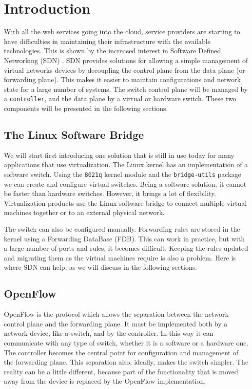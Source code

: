 \chapter{Introduction}
\label{chapter:intro}

With all the web services going into the cloud\cite{gartner}, service providers are starting to
have difficulties in maintaining their infrastructure with the available technologies.
This is shown by the increased interest in Software Defined Networking (SDN) \cite{sdn:whitepapers}.
SDN provides solutions for allowing a simple management of virtual networks devices by decoupling the control
plane from the data plane (or forwarding plane). This makes it easier to maintain configurations and network state
for a large number of systems. The switch control plane will be managed by a \texttt{controller},
and the data plane by a virtual or hardware switch. These two components will be presented in the following
sections.

\section{The Linux Software Bridge}
We will start first introducing one solution that is still in use today for many applications that use virtualization.
The Linux kernel has an implementation of a software switch. Using the \texttt{8021q} kernel module and the
\texttt{bridge-utils} package we can create and configure virtual switches. Being a software solution, it cannot
be faster than hardware switches. However, it brings a lot of flexibility. Virtualization products
use the Linux software bridge to connect multiple virtual machines together or to an external physical network.

The switch can also be configured manually. Forwarding rules are stored in the kernel using a Forwarding DataBase (FDB).
This can work in practice, but with a large number of ports and rules, it becomes difficult. Keeping the rules updated
and migrating them as the virtual machines require is also a problem. Here is where SDN can help, as we will discuss
in the following sections.

\section{OpenFlow}

OpenFlow is the protocol which allows the separation between the network control plane and the forwarding plane.
It must be implemented both by a network device, like a switch, and by the controller. In this way it 
can communicate with any type of switch, whether it is a software or a hardware one. The controller becomes
the central point for configuration and management of the forwarding plane. This separation also, ideally, makes the
switch simpler. The reality can be a little different, because part of the functionality that is moved away from
the device is replaced by the OpenFlow implementation.


